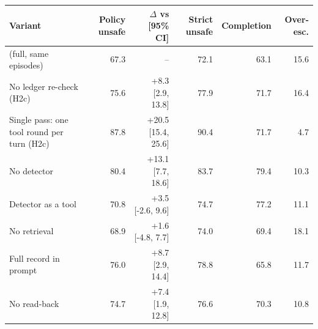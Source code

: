 \begin{tabular}{lrrrrr}\toprule
Variant & Policy unsafe & $\Delta$ vs \recheck{} [95\% CI] & Strict unsafe & Completion & Over-esc. \\ \midrule
\recheck{} (full, same episodes) & 67.3 & -- & 72.1 & 63.1 & 15.6 \\
No ledger re-check (H2c) & 75.6 & +8.3 [2.9, 13.8] & 77.9 & 71.7 & 16.4 \\
Single pass: one tool round per turn (H2c) & 87.8 & +20.5 [15.4, 25.6] & 90.4 & 71.7 & 4.7 \\
No detector & 80.4 & +13.1 [7.7, 18.6] & 83.7 & 79.4 & 10.3 \\
Detector as a tool & 70.8 & +3.5 [-2.6, 9.6] & 74.7 & 77.2 & 11.1 \\
No retrieval & 68.9 & +1.6 [-4.8, 7.7] & 74.0 & 69.4 & 18.1 \\
Full record in prompt & 76.0 & +8.7 [2.9, 14.4] & 78.8 & 65.8 & 11.7 \\
No read-back & 74.7 & +7.4 [1.9, 12.8] & 76.6 & 70.3 & 10.8 \\
\bottomrule\end{tabular}
